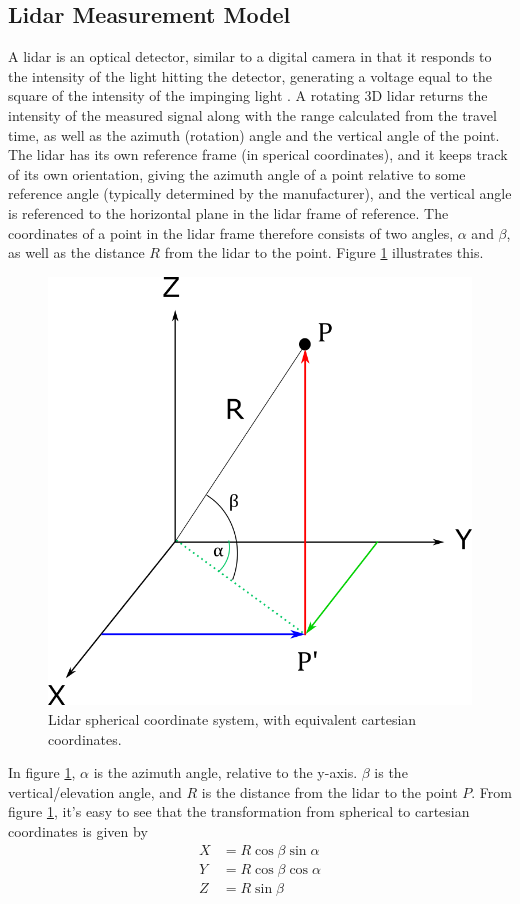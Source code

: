 \subsection{Lidar Measurement Model}
A lidar is an optical detector, similar to a digital camera in that it responds to the intensity of the light hitting the detector, generating a voltage equal to the square of the intensity of the impinging light \cite{SpieLidar}. A rotating 3D lidar returns the intensity of the measured signal along with the range calculated from the travel time, as well as the azimuth (rotation) angle and the vertical angle of the point. The lidar has its own reference frame (in sperical coordinates), and it keeps track of its own orientation, giving the azimuth angle of a point relative to some reference angle (typically determined by the manufacturer), and the vertical angle is referenced to the horizontal plane in the lidar frame of reference. The coordinates of a point in the lidar frame therefore consists of two angles, $\alpha$ and $\beta$, as well as the distance $R$ from the lidar to the point. Figure \ref{fig:lidar_spherical} illustrates this.
\begin{figure}[H]
    \centering
    \includegraphics[width=.8\linewidth]{fig/sperical_to_cartesian.png}
    \caption{Lidar spherical coordinate system, with equivalent cartesian coordinates.}
    \label{fig:lidar_spherical}
\end{figure}
In figure \ref{fig:lidar_spherical}, $\alpha$ is the azimuth angle, relative to the y-axis. $\beta$ is the vertical/elevation angle, and $R$ is the distance from the lidar to the point $P$.
From figure \ref{fig:lidar_spherical}, it's easy to see that the transformation from spherical to cartesian coordinates is given by
\begin{equation}
    \begin{split}
        X&=R\cos{\beta}\sin{\alpha}\\
        Y&=R\cos{\beta}\cos{\alpha}\\
        Z&=R\sin{\beta}
    \end{split}
\end{equation}
